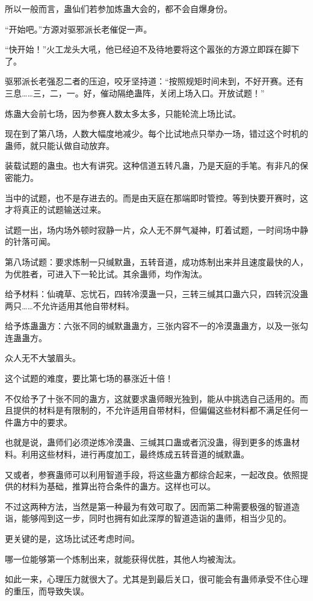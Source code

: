 \begin{this_body}
所以一般而言，蛊仙们若参加炼蛊大会的，都不会自爆身份。

“开始吧。”方源对驱邪派长老催促一声。

“快开始！”火工龙头大吼，他已经迫不及待地要将这个嚣张的方源立即踩在脚下了。

驱邪派长老强忍二者的压迫，咬牙坚持道：“按照规矩时间未到，不好开赛。还有三息……三，二，一。好，催动隔绝蛊阵，关闭上场入口。开放试题！”

炼蛊大会前七场，因为参赛人数太多太多，只能轮流上场比试。

现在到了第八场，人数大幅度地减少。每个比试地点只举办一场，错过这个时机的蛊师，就只能认做自动放弃。

装载试题的蛊虫。也大有讲究。这种信道五转凡蛊，乃是天庭的手笔。有非凡的保密能力。

当中的试题，也不是存进去的。而是由天庭在那端即时管控。等到快要开赛时，这才将真正的试题输送过来。

试题一出，场内场外顿时寂静一片，众人无不屏气凝神，盯着试题，一时间场中静的针落可闻。

第八场试题：要求炼制一只缄默蛊，五转音道，成功炼制出来并且速度最快的人，为优胜者，可进入下一轮比试。其余蛊师，均作淘汰。

给予材料：仙魂草、忘忧石，四转冷漠蛊一只，三转三缄其口蛊六只，四转沉没蛊两只……不允许适用其他自带材料。

给予炼蛊蛊方：六张不同的缄默蛊蛊方，三张内容不一的冷漠蛊蛊方，以及一张勾连蛊蛊方。

众人无不大皱眉头。

这个试题的难度，要比第七场的暴涨近十倍！

不仅给予了十张不同的蛊方，这就要求蛊师眼光独到，能从中挑选自己适用的。而且提供的材料是有限制的，不允许适用自带材料，但偏偏这些材料都不满足任何一件蛊方中的要求。

也就是说，蛊师们必须逆炼冷漠蛊、三缄其口蛊或者沉没蛊，得到更多的炼蛊材料。利用这些材料，进行再度加工，最终炼成五转音道的缄默蛊。

又或者，参赛蛊师可以利用智道手段，将这些蛊方都综合起来，一起改良。依照提供的材料为基础，推算出符合条件的蛊方。这样也可以。

不过这两种方法，当然是第一种最为有效可取了。因而第二种需要极强的智道造诣，能够闯到这一步，同时也拥有如此深厚的智道造诣的蛊师，相当少见的。

更关键的是，这场比试还考虑时间。

哪一位能够第一个炼制出来，就能获得优胜，其他人均被淘汰。

如此一来，心理压力就很大了。尤其是到最后关口，很可能会有蛊师承受不住心理的重压，而导致失误。


\end{this_body}
